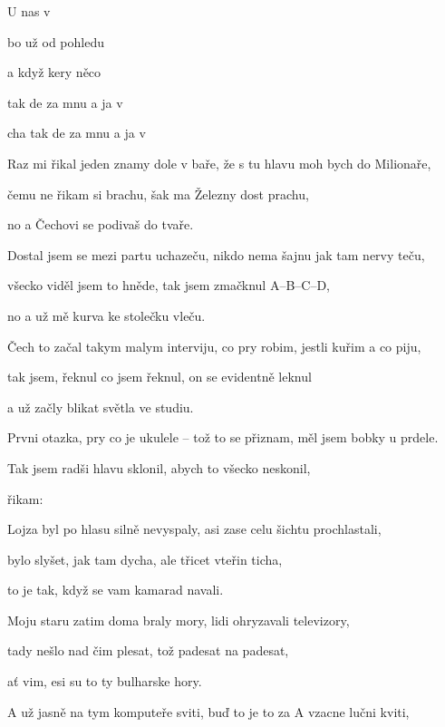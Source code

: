 


\zs
U nas v  

bo už od pohledu  

a když kery něco   

tak de za mnu a ja  v 

cha    tak de za mnu a ja  v 
\ks

\zs
Raz mi řikal jeden znamy dole v baře, že s tu hlavu moh bych do Milionaře,

čemu ne řikam si brachu, šak ma Železny dost prachu,

no a Čechovi se podivaš do tvaře.
\ks

\zs
Dostal jsem se mezi partu uchazeču, nikdo nema šajnu jak tam nervy teču,

všecko viděl jsem to hněde, tak jsem zmačknul A--B--C--D,

no a už mě kurva ke stolečku vleču.
\ks

\zs
Čech to začal takym malym interviju, co pry robim, jestli kuřim a co piju,

tak jsem, řeknul co jsem řeknul, on se evidentně leknul

a už začly blikat světla ve studiu.
\ks

\zs
Prvni otazka, pry co je ukulele -- tož to se přiznam, měl jsem bobky u prdele.

Tak jsem radši hlavu sklonil, abych to všecko neskonil,

řikam: 
\ks

\zs
Lojza byl po hlasu silně nevyspaly, asi zase celu šichtu prochlastali,

bylo slyšet, jak tam dycha, ale třicet vteřin ticha,

to je tak, když se vam kamarad navali.
\ks

\zs
Moju staru zatim doma braly mory, lidi ohryzavali televizory,

tady nešlo nad čim plesat, tož padesat na padesat,

ať vim, esi su to ty bulharske hory.
\ks

\zs
A už jasně na tym komputeře sviti, buď to je to za A vzacne lučni kviti,

